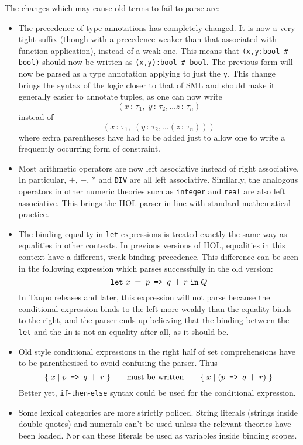 The changes which may cause old terms to fail to parse are:
\begin{itemize}
\newcommand\condexp{\holtxt{$p$ => $q$ | $r$}}
\item The precedence of type annotations has completely changed.  It
  is now a very tight suffix (though with a precedence weaker than
  that associated with function application), instead of a weak one.
  This means that \mbox{\tt (x,y:bool \# bool)} should now be written
  as \mbox{\tt (x,y):bool \# bool}. The previous form will now be
  parsed as a type annotation applying to just the \verb+y+.  This
  change brings the syntax of the logic closer to that of SML and
  should make it generally easier to annotate tuples, as one can now
  write \[ (x\,:\,\tau_1,\;y\,:\,\tau_2,\dots z\,:\,\tau_n)
  \] instead of \[
  (x\,:\,\tau_1, \;(y\,:\,\tau_2, \dots (z\,:\,\tau_n)))
  \] where extra parentheses have had to be added just to allow one to
  write a frequently occurring form of constraint.
\item Most arithmetic operators are now left associative instead of
  right associative.  In particular, $+$, $-$, $*$ and {\tt DIV} are
  all left associative.  Similarly, the analogous operators in other
  numeric theories such as {\tt integer} and {\tt real} are also left
  associative.  This brings the HOL parser in line with standard
  mathematical practice.
\item The binding equality in {\tt let} expressions is treated exactly
  the same way as equalities in other contexts.  In previous versions
  of HOL, equalities in this context have a different, weak binding
  precedence.  This difference can be seen in the following expression
  which parses successfully in the old version:
  \[ {\tt let} \; x \; = \; \condexp \; {\tt
  in} \;Q \] In Taupo releases and later, this expression will not
  parse because the conditional expression binds to the left more
  weakly than the equality binds to the right, and the parser ends up
  believing that the binding between the \verb+let+ and the \verb+in+
  is not an equality after all, as it should be.
\item Old style conditional expressions in the right half of set
  comprehensions have to be parenthesised to avoid confusing the
  parser.  Thus \[
  \{ \; x \; | \; \condexp \; \}
   \qquad\mbox{must be written} \qquad
  \{ \; x \; | \; (\condexp) \; \}
  \] Better yet, {\tt if}-{\tt then}-{\tt else} syntax could be used
  for the conditional expression.
\item Some lexical categories are more strictly policed.  String
  literals (strings inside double quotes) and numerals can't be used
  unless the relevant theories have been loaded.  Nor can these
  literals be used as variables inside binding scopes.
\end{itemize}


